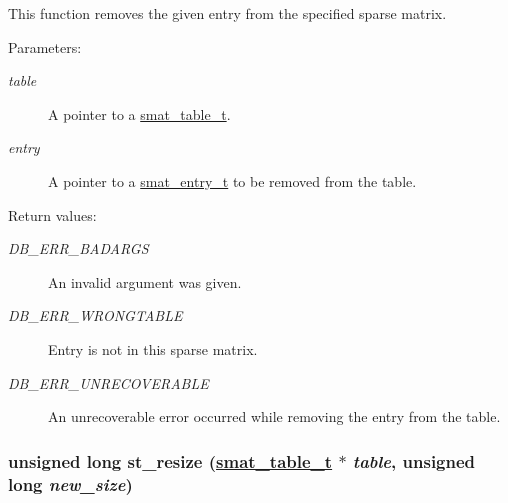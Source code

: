 This function removes the given entry from the specified sparse matrix.\begin{Desc}
\item[Parameters: ]\par
\begin{description}
\item[{\em 
table}]A pointer to a \hyperlink{group__dbprim__smat_a0}{smat\_\-table\_\-t}. \item[{\em 
entry}]A pointer to a \hyperlink{group__dbprim__smat_a2}{smat\_\-entry\_\-t} to be removed from the table.\end{description}
\end{Desc}
\begin{Desc}
\item[Return values: ]\par
\begin{description}
\item[{\em 
DB\_\-ERR\_\-BADARGS}]An invalid argument was given. \item[{\em 
DB\_\-ERR\_\-WRONGTABLE}]Entry is not in this sparse matrix. \item[{\em 
DB\_\-ERR\_\-UNRECOVERABLE}]An unrecoverable error occurred while removing the entry from the table. \end{description}
\end{Desc}
\hypertarget{group__dbprim__smat_a15}{
\subsubsection[st\_\-resize]{\setlength{\rightskip}{0pt plus 5cm}unsigned long st\_\-resize (\hyperlink{group__dbprim__smat_a0}{smat\_\-table\_\-t} $\ast$ {\em table}, unsigned long {\em new\_\-size})}}
\label{group__dbprim__smat_a15}


